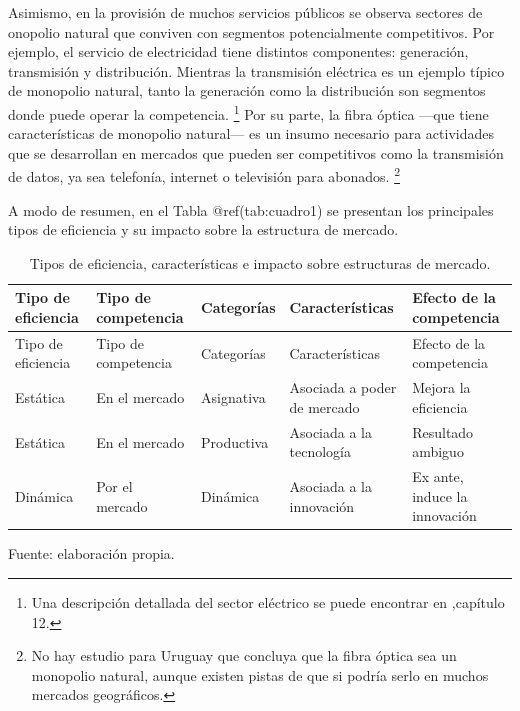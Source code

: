 \documentclass[
  12pt,
  spanish,
]{book}
\begin{document}
Asimismo, en la provisión de muchos servicios públicos se observa
sectores de onopolio natural que conviven con segmentos potencialmente
competitivos. Por ejemplo, el servicio de electricidad tiene distintos
componentes: generación, transmisión y distribución. Mientras la
transmisión eléctrica es un ejemplo típico de monopolio natural, tanto
la generación como la distribución son segmentos donde puede operar la
competencia. \footnote{Una descripción detallada del sector eléctrico se
  puede encontrar en \citet{Viscusi2005},capítulo 12.} Por su parte, la
fibra óptica ---que tiene características de monopolio natural--- es un
insumo necesario para actividades que se desarrollan en mercados que
pueden ser competitivos como la transmisión de datos, ya sea telefonía,
internet o televisión para abonados. \footnote{No hay estudio para
  Uruguay que concluya que la fibra óptica sea un monopolio natural,
  aunque existen pistas de que si podría serlo en muchos mercados
  geográficos.}

A modo de resumen, en el Tabla @ref(tab:cuadro1) se presentan los
principales tipos de eficiencia y su impacto sobre la estructura de
mercado.

\begin{longtable}[]{@{}lllll@{}}
\caption{Tipos de eficiencia, características e impacto sobre
estructuras de mercado.}\tabularnewline
\toprule
Tipo de eficiencia & Tipo de competencia & Categorías & Características
& Efecto de la competencia\tabularnewline
\midrule
\endfirsthead
\toprule
Tipo de eficiencia & Tipo de competencia & Categorías & Características
& Efecto de la competencia\tabularnewline
\midrule
\endhead
Estática & En el mercado & Asignativa & Asociada a poder de mercado &
Mejora la eficiencia\tabularnewline
Estática & En el mercado & Productiva & Asociada a la tecnología &
Resultado ambiguo\tabularnewline
Dinámica & Por el mercado & Dinámica & Asociada a la innovación & Ex
ante, induce la innovación\tabularnewline
\bottomrule
\end{longtable}

Fuente: elaboración propia.
\end{document}
